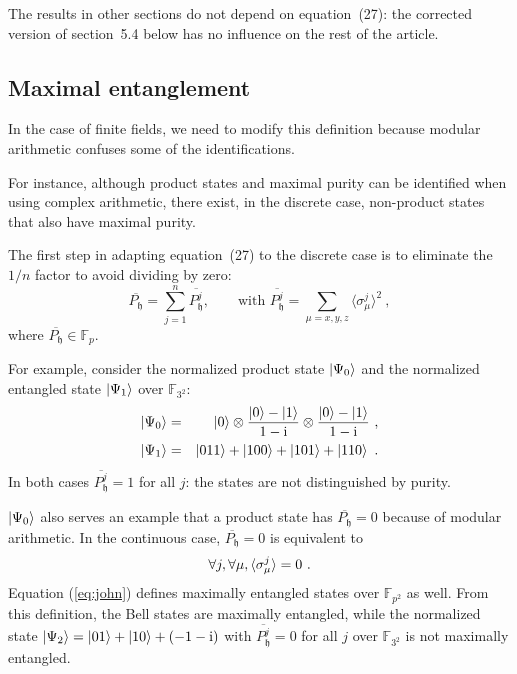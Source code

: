 \documentclass{iopart}
\newcommand{\ComplexI}{\text{i}}
\newcommand{\ff}[1]{\mathbb{F}_{#1}}
\def\fh{\mathfrak{h}}
\begin{document}
\bigskip The results in other sections do not depend on equation~(27): the corrected version of section~5.4 below has no influence on the rest of the article. 

\subsection{Maximal entanglement}


In the case of finite fields, we need to modify this definition because modular arithmetic confuses some of the identifications. 



For instance, although product states and maximal purity can be identified when using complex arithmetic, there exist, in the discrete case, non-product states that also have maximal purity. 

The first step in adapting equation~(27) to the discrete case is to eliminate the $1/n$ factor to avoid dividing by zero: 
\begin{equation}
\overline{P_{\fh}}=\sum\limits _{j=1}^{n}\overline{P_{\fh}^{j}}, \qquad\mbox{with~}
\overline{P_{\fh}^j} = \sum\limits _{\mu=x,y,z}\langle\sigma_{\mu}^{j}\rangle^{2}\ ,
\end{equation}
where $\overline{P_{\fh}}\in\ff{p}$. 

For example, consider the normalized product state $\ket{\Psi_{0}}$ and the normalized entangled 
state $\ket{\Psi_{1}}$ over $\ff{3^{2}}$: 
\begin{eqnarray}
\ket{\Psi_{0}} & = & \ket{0}\otimes\frac{\ket{0}-\ket{1}}{1-\ComplexI}\otimes\frac{\ket{0}-\ket{1}}{1-\ComplexI}\ ,\\
\ket{\Psi_{1}} & = & \ket{011}+\ket{100}+\ket{101}+\ket{110}\ .
\end{eqnarray}
In both cases $\overline{P_{\fh}^j} = 1$ for all $j$: the states are not distinguished by purity. 

$\ket{\Psi_{0}}$ also serves an example that a product state has
$\overline{P_{\fh}}=0$ because of modular arithmetic. In the continuous
case, $\overline{P_{\fh}}=0$ is equivalent to 
\begin{equation}
\forall j,\forall\mu,\braket{\sigma_{\mu}^{j}}=0\ .\label{eq:john}
\end{equation}
Equation (\ref{eq:john}) defines maximally entangled states over
$\ff{p^{2}}$ as well. From this definition, the Bell states are maximally
entangled, while the normalized state $\ket{\Psi_{2}}=\ket{01}+\ket{10}+\left(-1-\ComplexI\right)$
with $\overline{P_{\fh}^{j}}=0$ for all $j$ over $\ff{3^{2}}$ is
not maximally entangled.
\end{document}
